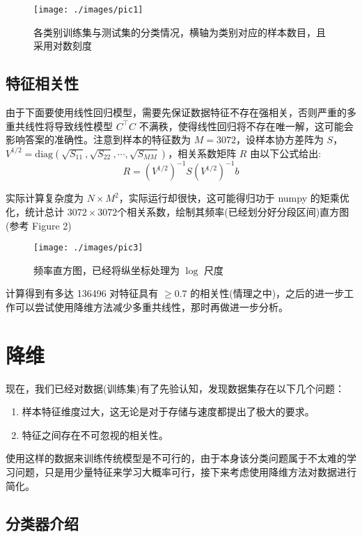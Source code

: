 \documentclass[fleqn]{Paquetes/RevDigMatEduInt}
\begin{document}
\begin{figure}[h]
	\centering
	\texttt{[image: ./images/pic1]}
	\caption{各类别训练集与测试集的分类情况，横轴为类别对应的样本数目，且采用对数刻度}
\end{figure}



\subsection{特征相关性}

由于下面要使用线性回归模型，需要先保证数据特征不存在强相关，否则严重的多重共线性将导致线性模型 $C^\top C$ 不满秩，使得线性回归将不存在唯一解，这可能会影响答案的准确性。注意到样本的特征数为 $M = 3072$，设样本协方差阵为 $S$，$V^{1/2} = \mathrm{diag}(\sqrt{S_{11}},  \sqrt{S_{22}},\cdots,\sqrt{S_{MM}})$，相关系数矩阵  $R$ 由以下公式给出:
$$
R = (V^{1/2})^{-1}S(V^{1/2})^{-1}b 
$$

实际计算复杂度为 $N \times M^2$，实际运行却很快，这可能得归功于 numpy 的矩乘优化，统计总计 $3072 \times 3072$个相关系数，绘制其频率(已经划分好分段区间)直方图(参考 Figure 2)

\begin{figure}[h]
	\centering
	\texttt{[image: ./images/pic3]}
	\caption{频率直方图，已经将纵坐标处理为 $\log$ 尺度}
\end{figure}

计算得到有多达 136496 对特征具有 $\geq 0.7$ 的相关性(情理之中)，之后的进一步工作可以尝试使用降维方法减少多重共线性，那时再做进一步分析。


\section{降维}
现在，我们已经对数据(训练集)有了先验认知，发现数据集存在以下几个问题：
\begin{observacion}
\begin{enumerate}
	\item 样本特征维度过大，这无论是对于存储与速度都提出了极大的要求。
	\item 特征之间存在不可忽视的相关性。
\end{enumerate}
\end{observacion}
使用这样的数据来训练传统模型是不可行的，由于本身该分类问题属于不太难的学习问题，只是用少量特征来学习大概率可行，接下来考虑使用降维方法对数据进行简化。


\subsection{分类器介绍}
\end{document}
